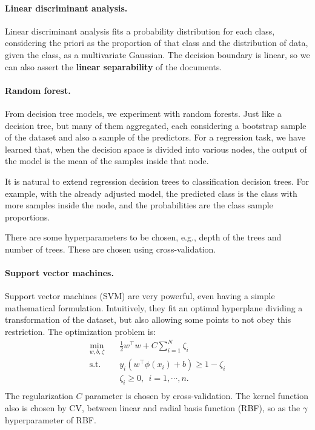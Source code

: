 \documentclass[twocolumn]{article}
\begin{document}
                  \paragraph{Linear discriminant analysis.} Linear discriminant analysis fits a probability distribution for each class, considering the priori as the proportion of that class and the distribution of data, given the class, as a multivariate Gaussian. The decision boundary is linear, so we can also assert the \textbf{linear separability} of the documents.

                  \paragraph{Random forest.} From decision tree models, we experiment with random forests. Just like a decision tree, but many of them aggregated, each considering a bootstrap sample of the dataset and also a sample of the predictors. For a regression task, we have learned that, when the decision space is divided into various nodes, the output of the model is the mean of the samples inside that node.

                  It is natural to extend regression decision trees to classification decision trees. For example, with the already adjusted model, the predicted class is the class with more samples inside the node, and the probabilities are the class sample proportions.
                  
                  There are some hyperparameters to be chosen, e.g., depth of the trees and number of trees. These are chosen using cross-validation.

                  \paragraph{Support vector machines.} Support vector machines (SVM) are very powerful, even having a simple mathematical formulation. Intuitively, they fit an optimal hyperplane dividing a transformation of the dataset, but also allowing some points to not obey this restriction. The optimization problem is:
                  \[\begin{aligned}
                      \min_{w, b, \zeta} \quad & \frac{1}{2}w^\intercal w + C \sum_{i = 1}^{N}{\zeta_i} \\
                      \textrm{s.t.} \quad & y_i (w^\intercal \phi(x_i) + b) \ge 1 - \zeta_i \\
                      & \zeta_i \ge 0, \ \ i = 1, \cdots, n. \\
                  \end{aligned}\]
                  The regularization $C$ parameter is chosen by cross-validation. The kernel function also is chosen by CV, between linear and radial basis function (RBF), so as the $\gamma$ hyperparameter of RBF.
\end{document}
